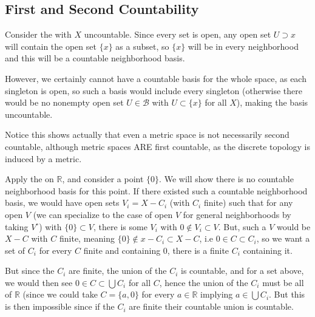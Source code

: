 \documentclass[12pt,letterpaper,reqno]{article}
\begin{document}
\subsection{First and Second Countability}

\begin{example}\label{counterexample:first-not-second-countable-space}
    Consider the  with $X$ uncountable. Since every set is open, any open set $U \supset x$ will contain the open set $\{ x \}$ as a subset, so $\{ x \}$ will be in every neighborhood and this will be a countable neighborhood basis. 

    However, we certainly cannot have a countable basis for the whole space, as each singleton is open, so such a basis would include every singleton (otherwise there would be no nonempty open set $U \in \mathcal{B}$ with $U \subset \{ x \} $ for all $X$), making the basis uncountable.
\end{example}

Notice this shows actually that even a metric space is not necessarily second countable, although metric spaces ARE first countable, as the discrete topology is induced by a metric. 

\begin{example}\label{counterexample:non-first-countable-space}
    Apply the  on $\mathbb{R}$, and consider a point $\{ 0 \}$. We will show there is no countable neighborhood basis for this point. If there existed such a countable neighborhood basis, we would have open sets $V_i = X - C_i$ (with $C_i$ finite) such that for any open $V$ (we can specialize to the case of open $V$ for general neighborhoods by taking $V^{\circ}$) with $\{ 0 \} \subset V$, there is some $V_i$ with $0 \notin V_i \subset V$. But, such a $V$ would be $X-C$ with $C$ finite, meaning $\{ 0 \} \notin x-C_i \subset X-C$, i.e $0 \in C \subset C_i$, so we want a set of $C_i$ for every $C$ finite and containing $0$, there is a finite $C_i$ containing it.  
    
    But since the $C_i$ are finite, the union of the $C_i$ is countable, and for a set above, we would then see $0 \in C \subset \bigcup C_i$ for all $C$, hence the union of the $C_i$ must be all of $\mathbb{R}$ (since we could take $C = \{a, 0 \}$ for every $a \in \mathbb{R}$ implying $a \in \bigcup C_i$. But this is then impossible since if the $C_i$ are finite their countable union is countable. 
\end{example}
\end{document}

